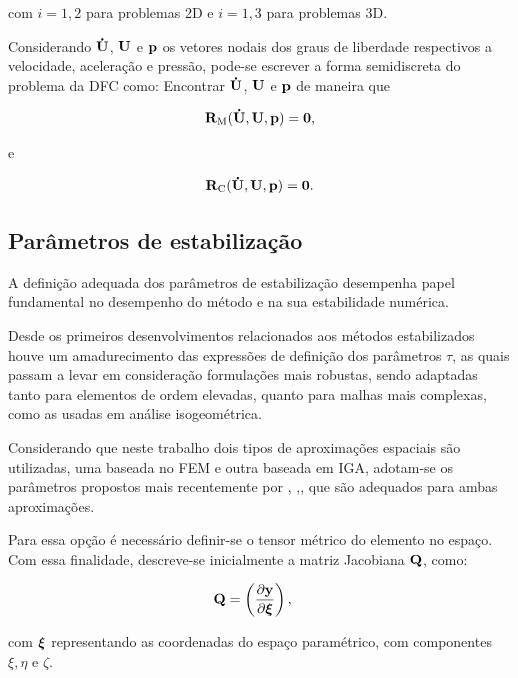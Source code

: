 \documentclass[tese_patricia]{subfiles}%
\begin{document}
\noindent com $i=1,2$ para problemas 2D e $i=1,3$ para problemas 3D.
		
Considerando $\mathbf{\dot{U}}$, $\mathbf{U}$ e $\mathbf{p}$ os vetores nodais dos graus de liberdade respectivos a velocidade, aceleração e pressão, pode-se escrever a forma semidiscreta do problema da DFC como: Encontrar $\mathbf{\dot{U}}$, $\mathbf{U}$ e $\mathbf{p}$ de maneira que

\begin{align}
\mathbf{R}_\mathrm{M}(\mathbf{\dot{U}},\mathbf{U},\mathbf{p}) = \mathbf{0},\label{eq:resid_semi_discr_QM}
\end{align}

\noindent e

\begin{align}
\mathbf{R}_\mathrm{C}(\mathbf{\dot{U}},\mathbf{U},\mathbf{p}) = \mathbf{0}. \label{eq:resid_semi_discr_C}
\end{align}

\subsection{Parâmetros de estabilização}\label{capitulo:Cap2:FormaFraca:taus}

A definição adequada dos parâmetros de estabilização desempenha papel fundamental no desempenho do método e na sua estabilidade numérica.

Desde os primeiros desenvolvimentos relacionados aos métodos estabilizados houve um amadurecimento das expressões de definição dos parâmetros $\tau$, as quais passam a levar em consideração formulações mais robustas, sendo adaptadas tanto para elementos de ordem elevadas, quanto para malhas mais complexas, como as usadas em análise isogeométrica.

Considerando que neste trabalho dois tipos de aproximações espaciais são utilizadas, uma baseada no FEM e outra baseada em IGA, adotam-se os parâmetros propostos mais recentemente por , ,, que são adequados para ambas aproximações. 

Para essa opção é necessário definir-se o tensor métrico do elemento no espaço. Com essa finalidade, descreve-se inicialmente a matriz Jacobiana $\mathbf{Q}$, como:

\begin{align}
	\mathbf{Q}&=\left(\frac{\partial\mathbf{y}}{\partial\bm{\xi}}\right),
\end{align}

\noindent com $\bm{\xi}$ representando as coordenadas do espaço paramétrico, com componentes $\xi, \eta$ e $\zeta$.
\end{document}
